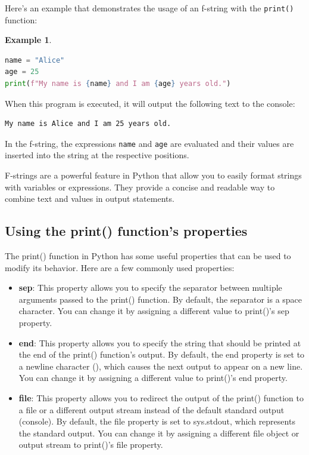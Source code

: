 \documentclass[12pt]{article}
\newtheorem{Example}{Example}[section]
\begin{document}
Here's an example that demonstrates the usage of an f-string with the \texttt{print()} function:

\begin{Example}
\begin{lstlisting}[language=Python]
name = "Alice"
age = 25
print(f"My name is {name} and I am {age} years old.")
\end{lstlisting}
\end{Example}

When this program is executed, it will output the following text to the console:

\begin{verbatim}
My name is Alice and I am 25 years old.
\end{verbatim}

In the f-string, the expressions \texttt{{name}} and \texttt{{age}} are evaluated and their values are inserted into the string at the respective positions.

F-strings are a powerful feature in Python that allow you to easily format strings with variables or expressions. They provide a concise and readable way to combine text and values in output statements.



\subsection{Using the print() function's properties}

The print() function in Python has some useful properties that can be used to modify its behavior. Here are a few commonly used properties:

\begin{itemize}
\item \textbf{sep}: This property allows you to specify the separator between multiple arguments passed to the print() function. By default, the separator is a space character. You can change it by assigning a different value to print()'s sep property.

\item \textbf{end}: This property allows you to specify the string that should be printed at the end of the print() function's output. By default, the end property is set to a newline character (\n), which causes the next output to appear on a new line. You can change it by assigning a different value to print()'s end property.

\item \textbf{file}: This property allows you to redirect the output of the print() function to a file or a different output stream instead of the default standard output (console). By default, the file property is set to sys.stdout, which represents the standard output. You can change it by assigning a different file object or output stream to print()'s file property.

\end{itemize}
\end{document}
